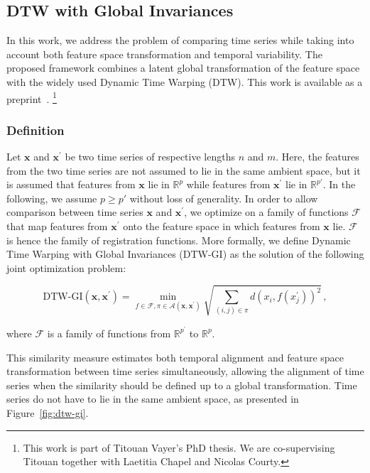 \subsection{DTW with Global Invariances}
\label{sec:dtw_gi}

In this work, we address the problem of comparing time series while taking
into account both feature space transformation and temporal variability.
The proposed framework combines a latent global transformation of the feature
space with the widely used Dynamic Time Warping (DTW).
This work is available as a preprint~\cite{vayer2020time}.%
\footnote{\label{fn:titouan}This work is part of Titouan Vayer's PhD thesis.
We are co-supervising Titouan together with Laetitia Chapel and Nicolas Courty.}

\subsubsection{Definition}

Let $\mathbf{x}$ and $\mathbf{x^\prime}$ be two time series of respective
lengths $n$ and $m$.
Here, the features from the two time series are not assumed to lie in the same
ambient
space, but it is assumed that features from $\mathbf{x}$ lie in $\mathbb{R}^p$
while features from $\mathbf{x^\prime}$ lie in $\mathbb{R}^{p'}$.
In the following, we assume $p \geq p'$ without loss of generality.
In order to allow comparison between time series $\mathbf{x}$ and
$\mathbf{x^\prime}$,
we optimize on a family of functions $\mathcal{F}$ that map features from
$\mathbf{x^\prime}$ onto the feature space in which features from $\mathbf{x}$
lie. $\mathcal{F}$ is hence the family of registration functions.
More formally, we define Dynamic Time Warping with Global Invariances
(DTW-GI) as the solution of the following joint optimization problem:

\begin{equation}
    \text{DTW-GI}(\mathbf{x}, \mathbf{x^\prime}) =
        \min_{f \in \mathcal{F}, \pi \in \mathcal{A}(\mathbf{x}, \mathbf{x^\prime})}
            \sqrt{ \sum_{(i, j) \in \pi} d(x_i, f(x^\prime_j))^2 } \, ,
    \label{eq:dtwgi}
\end{equation}

where $\mathcal{F}$ is a family of functions from $\mathbb{R}^{p^\prime}$ to
$\mathbb{R}^{p}$.

This similarity measure estimates both temporal alignment and feature space
transformation between time series simultaneously, allowing the alignment of
time series when the similarity should be defined up to a global transformation.
Time series do not have to lie in the same ambient space, as presented in
Figure~\ref{fig:dtw-gi}.

